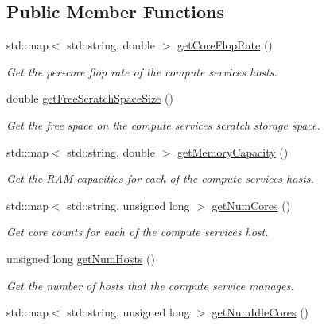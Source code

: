 \subsection*{Public Member Functions}
\begin{DoxyCompactItemize}
\item 
std\+::map$<$ std\+::string, double $>$ \hyperlink{classwrench_1_1_compute_service_a72c2608b82692ad73888d9b9f7c6bd0c}{get\+Core\+Flop\+Rate} ()
\begin{DoxyCompactList}\small\item\em Get the per-\/core flop rate of the compute service\textquotesingle{}s hosts. \end{DoxyCompactList}\item 
double \hyperlink{classwrench_1_1_compute_service_ac3662628f589ffe44e17921e60971fd6}{get\+Free\+Scratch\+Space\+Size} ()
\begin{DoxyCompactList}\small\item\em Get the free space on the compute service\textquotesingle{}s scratch storage space. \end{DoxyCompactList}\item 
std\+::map$<$ std\+::string, double $>$ \hyperlink{classwrench_1_1_compute_service_a113d9698fc83cefd78121e279b99b51e}{get\+Memory\+Capacity} ()
\begin{DoxyCompactList}\small\item\em Get the R\+AM capacities for each of the compute service\textquotesingle{}s hosts. \end{DoxyCompactList}\item 
std\+::map$<$ std\+::string, unsigned long $>$ \hyperlink{classwrench_1_1_compute_service_a0d88426f33110e811771f73f39c6458a}{get\+Num\+Cores} ()
\begin{DoxyCompactList}\small\item\em Get core counts for each of the compute service\textquotesingle{}s host. \end{DoxyCompactList}\item 
unsigned long \hyperlink{classwrench_1_1_compute_service_a1b576a22529bd638e6998f0513a44b36}{get\+Num\+Hosts} ()
\begin{DoxyCompactList}\small\item\em Get the number of hosts that the compute service manages. \end{DoxyCompactList}\item 
std\+::map$<$ std\+::string, unsigned long $>$ \hyperlink{classwrench_1_1_compute_service_a7d717171627835491772e589c4e6101f}{get\+Num\+Idle\+Cores} ()

\end{DoxyCompactItemize}
